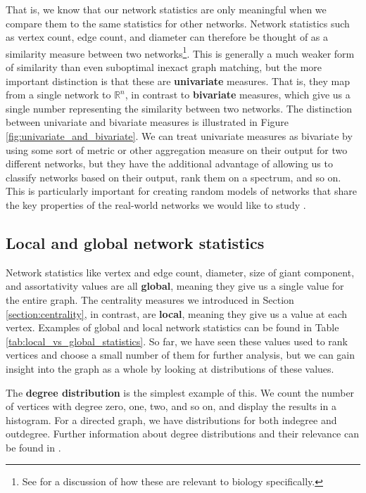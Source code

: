 \documentclass[12pt]{thesis}
\theoremstyle{plain}
\theoremstyle{definition}
\theoremstyle{remark}
\newcommand{\R}{\mathbb{R}}
\begin{document}
That is, we know that our network statistics are only meaningful when we compare them to the same statistics for other networks. 
Network statistics such as vertex count, edge count, and diameter can therefore be thought of as a similarity measure between two networks\footnote{See \cite{Aittokallio_2006} for a discussion of how these are relevant to biology specifically.}. This is generally a much weaker form of similarity than even suboptimal inexact graph matching, but the more important distinction is that these are \textbf{univariate} measures. That is, they map from a single network to $\R^n$, in contrast to \textbf{bivariate} measures, which give us a single number representing the similarity between two networks. The distinction between univariate and bivariate measures is illustrated in Figure \ref{fig:univariate_and_bivariate}. We can treat univariate measures as bivariate by using some sort of metric or other aggregation measure on their output for two different networks, but they have the additional advantage of allowing us to classify networks based on their output, rank them on a spectrum, and so on. This is particularly important for creating random models of networks that share the key properties of the real-world networks we would like to study \cite{Hayes_2013, Watts_1998}.

\subsection{Local and global network statistics}

Network statistics like vertex and edge count, diameter, size of giant component, and assortativity values are all \textbf{global}, meaning they give us a single value for the entire graph. The centrality measures we introduced in Section \ref{section:centrality}, in contrast, are \textbf{local}, meaning they give us a value at each vertex. Examples of global and local network statistics can be found in Table \ref{tab:local_vs_global_statistics}. So far, we have seen these values used to rank vertices and choose a small number of them for further analysis, but we can gain insight into the graph as a whole by looking at distributions of these values.

The \textbf{degree distribution} is the simplest example of this. We count the number of vertices with degree zero, one, two, and so on, and display the results in a histogram. For a directed graph, we have distributions for both indegree and outdegree. Further information about degree distributions and their relevance can be found in \cite{newman2010}.
\end{document}
